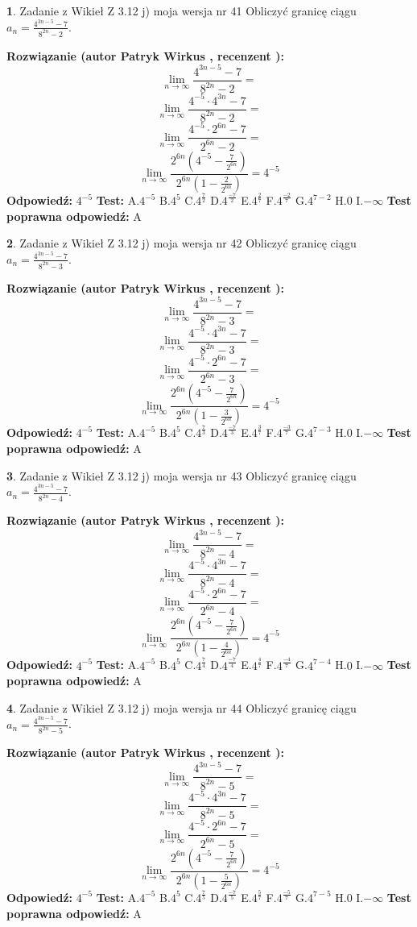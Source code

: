 \documentclass[12pt, a4paper]{article}
\theoremstyle{definition} %
\newtheorem{zad}{}
\newcommand{\zadStart}[1]{\begin{zad}#1\newline}
\newcommand{\zadStop}{\end{zad}}
\newcommand{\rozwStart}[2]{\noindent \textbf{Rozwiązanie (autor #1 , recenzent #2): }\newline}
\newcommand{\rozwStop}{\newline}
\newcommand{\odpStart}{\noindent \textbf{Odpowiedź:}\newline}
\newcommand{\odpStop}{\newline}
\newcommand{\testStart}{\noindent \textbf{Test:}\newline}
\newcommand{\testStop}{\newline}
\newcommand{\kluczStart}{\noindent \textbf{Test poprawna odpowiedź:}\newline}
\newcommand{\kluczStop}{\newline}
\begin{document}
\zadStart{Zadanie z Wikieł Z 3.12 j) moja wersja nr 41}
Obliczyć granicę ciągu $a_{n}=\frac{4^{3n-5}-7}{8^{2n}-2}$.
\zadStop
\rozwStart{Patryk Wirkus}{}
$$\lim\limits_{n\to\infty}\frac{4^{3n-5}-7}{8^{2n}-2}=$$
$$\lim\limits_{n\to\infty}\frac{4^{-5} \cdot 4^{3n}-7}{8^{2n}-2}=$$
$$\lim\limits_{n\to\infty}\frac{4^{-5} \cdot 2^{6n}-7}{2^{6n}-2}=$$
$$\lim\limits_{n\to\infty}\frac{2^{6n}(4^{-5} - \frac{7}{2^{6n}})}{2^{6n}(1-\frac{2}{2^{6n}})}= 4^{-5}$$
\rozwStop
\odpStart
$4^{-5}$
\odpStop
\testStart
A.$4^{-5}$
B.$4^{5}$
C.$4^{\frac{7}{2}}$
D.$4^{\frac{-7}{2}}$
E.$4^{\frac{2}{7}}$
F.$4^{\frac{-2}{7}}$
G.$4^{7-2}$
H.$0$
I.$-\infty$
\testStop
\kluczStart
A
\kluczStop



\zadStart{Zadanie z Wikieł Z 3.12 j) moja wersja nr 42}
Obliczyć granicę ciągu $a_{n}=\frac{4^{3n-5}-7}{8^{2n}-3}$.
\zadStop
\rozwStart{Patryk Wirkus}{}
$$\lim\limits_{n\to\infty}\frac{4^{3n-5}-7}{8^{2n}-3}=$$
$$\lim\limits_{n\to\infty}\frac{4^{-5} \cdot 4^{3n}-7}{8^{2n}-3}=$$
$$\lim\limits_{n\to\infty}\frac{4^{-5} \cdot 2^{6n}-7}{2^{6n}-3}=$$
$$\lim\limits_{n\to\infty}\frac{2^{6n}(4^{-5} - \frac{7}{2^{6n}})}{2^{6n}(1-\frac{3}{2^{6n}})}= 4^{-5}$$
\rozwStop
\odpStart
$4^{-5}$
\odpStop
\testStart
A.$4^{-5}$
B.$4^{5}$
C.$4^{\frac{7}{3}}$
D.$4^{\frac{-7}{3}}$
E.$4^{\frac{3}{7}}$
F.$4^{\frac{-3}{7}}$
G.$4^{7-3}$
H.$0$
I.$-\infty$
\testStop
\kluczStart
A
\kluczStop



\zadStart{Zadanie z Wikieł Z 3.12 j) moja wersja nr 43}
Obliczyć granicę ciągu $a_{n}=\frac{4^{3n-5}-7}{8^{2n}-4}$.
\zadStop
\rozwStart{Patryk Wirkus}{}
$$\lim\limits_{n\to\infty}\frac{4^{3n-5}-7}{8^{2n}-4}=$$
$$\lim\limits_{n\to\infty}\frac{4^{-5} \cdot 4^{3n}-7}{8^{2n}-4}=$$
$$\lim\limits_{n\to\infty}\frac{4^{-5} \cdot 2^{6n}-7}{2^{6n}-4}=$$
$$\lim\limits_{n\to\infty}\frac{2^{6n}(4^{-5} - \frac{7}{2^{6n}})}{2^{6n}(1-\frac{4}{2^{6n}})}= 4^{-5}$$
\rozwStop
\odpStart
$4^{-5}$
\odpStop
\testStart
A.$4^{-5}$
B.$4^{5}$
C.$4^{\frac{7}{4}}$
D.$4^{\frac{-7}{4}}$
E.$4^{\frac{4}{7}}$
F.$4^{\frac{-4}{7}}$
G.$4^{7-4}$
H.$0$
I.$-\infty$
\testStop
\kluczStart
A
\kluczStop



\zadStart{Zadanie z Wikieł Z 3.12 j) moja wersja nr 44}
Obliczyć granicę ciągu $a_{n}=\frac{4^{3n-5}-7}{8^{2n}-5}$.
\zadStop
\rozwStart{Patryk Wirkus}{}
$$\lim\limits_{n\to\infty}\frac{4^{3n-5}-7}{8^{2n}-5}=$$
$$\lim\limits_{n\to\infty}\frac{4^{-5} \cdot 4^{3n}-7}{8^{2n}-5}=$$
$$\lim\limits_{n\to\infty}\frac{4^{-5} \cdot 2^{6n}-7}{2^{6n}-5}=$$
$$\lim\limits_{n\to\infty}\frac{2^{6n}(4^{-5} - \frac{7}{2^{6n}})}{2^{6n}(1-\frac{5}{2^{6n}})}= 4^{-5}$$
\rozwStop
\odpStart
$4^{-5}$
\odpStop
\testStart
A.$4^{-5}$
B.$4^{5}$
C.$4^{\frac{7}{5}}$
D.$4^{\frac{-7}{5}}$
E.$4^{\frac{5}{7}}$
F.$4^{\frac{-5}{7}}$
G.$4^{7-5}$
H.$0$
I.$-\infty$
\testStop
\kluczStart
A
\kluczStop
\end{document}
